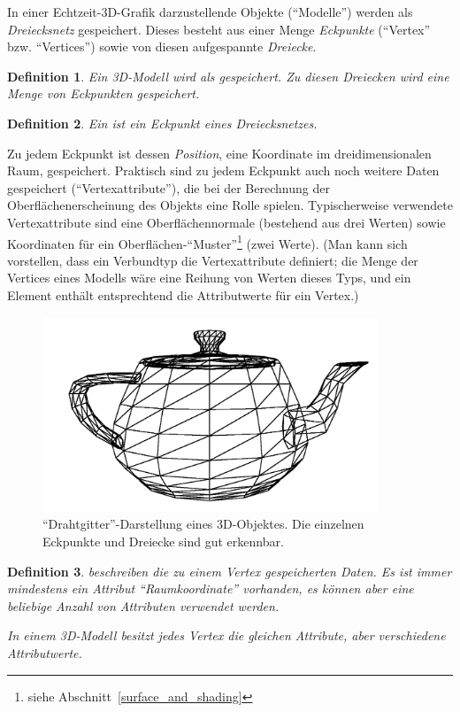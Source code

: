 \documentclass[twoside,a4paper,fleqn,12pt]{book}
\newtheorem{defn}{Definition}
\begin{document}
In einer Echtzeit-3D-Grafik darzustellende Objekte ("`Modelle"') werden als \emph{Dreiecksnetz} gespeichert.
Dieses besteht aus einer Menge \emph{Eckpunkte} (``Vertex'' bzw. ``Vertices'')
sowie von diesen aufgespannte \emph{Dreiecke}.

\begin{defn}
Ein \emph{3D-Modell} wird als  gespeichert.
Zu diesen Dreiecken wird eine Menge von \emph{Eckpunkten} gespeichert.
\end{defn}

\begin{defn}
Ein  ist ein Eckpunkt eines Dreiecksnetzes.
\end{defn}

Zu jedem Eckpunkt ist dessen \emph{Position}, eine Koordinate im dreidimensionalen Raum, gespeichert.
Praktisch sind zu jedem Eckpunkt auch noch weitere Daten gespeichert ("`Vertexattribute"'),
die bei der Berechnung der Oberflächenerscheinung des Objekts eine Rolle spielen.
Typischerweise verwendete Vertexattribute sind eine Oberflächennormale (bestehend aus drei Werten)
sowie Koordinaten für ein Oberflächen-"`Muster"'\footnote{siehe Abschnitt~\ref{surface_and_shading}} (zwei Werte).
(Man kann sich vorstellen, dass ein Verbundtyp die Vertexattribute definiert; die Menge der Vertices eines Modells wäre
eine Reihung von Werten dieses Typs, und ein Element enthält entsprechtend die Attributwerte für ein Vertex.)

\begin{figure}[h]
  \centering
  \includegraphics[width=10cm]{mesh_wireframe_thick}
  \caption{"`Drahtgitter"'-Darstellung eines 3D-Objektes. Die einzelnen Eckpunkte und Dreiecke sind gut erkennbar.}
  \label{fig:wireframe_teapot}
\end{figure}

\begin{defn}
 beschreiben die zu einem Vertex gespeicherten Daten. Es ist immer mindestens
ein Attribut "`Raumkoordinate"' vorhanden, es können aber eine beliebige Anzahl von Attributen verwendet werden.

In einem 3D-Modell besitzt jedes Vertex die gleichen Attribute, aber verschiedene Attribut\emph{werte}.
\end{defn}
\end{document}
